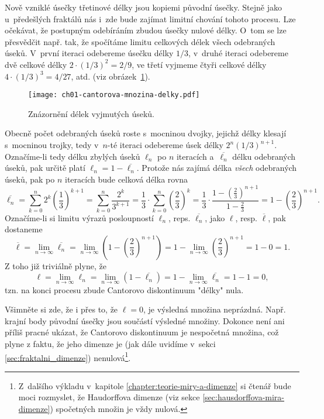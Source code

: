 Nově vzniklé úsečky třetinové délky jsou kopiemi původní úsečky. Stejně jako u~předešlých fraktálů nás i~zde bude zajímat limitní chování tohoto procesu. Lze očekávat, že postupným odebíráním zbudou úsečky nulové délky. O~tom se lze přesvědčit např. tak, že spočítáme limitu celkových délek všech odebraných úseků. V~první iteraci odebereme úsečku délky $1/3$, v~druhé iteraci odebereme dvě celkové délky $2\cdot(1/3)^2=2/9$, ve třetí vyjmeme čtyři celkové délky $4\cdot(1/3)^3=4/27$, atd. (viz obrázek~\ref{fig:cantorovo_diskontinuum_delky}).
\begin{figure}[h]
    \centering
    \texttt{[image: ch01-cantorova-mnozina-delky.pdf]}
    \caption{Znázornění délek vyjmutých úseků.}
    \label{fig:cantorovo_diskontinuum_delky}
\end{figure}
Obecně počet odebraných úseků roste s~mocninou dvojky, jejichž délky klesají s~mocninou trojky, tedy v~$n$-té iteraci odebereme úsek délky $2^n(1/3)^{n+1}$. Označíme-li tedy délku zbylých úseků $\ell_n$ po $n$ iteracích a~$\overline{\ell_n}$ délku odebraných úseků, pak určitě platí $\ell_n=1-\overline{\ell_n}$. Protože nás zajímá délka \emph{všech} odebraných úseků, pak po $n$ iteracích bude celková délka rovna
\begin{equation}
    \overline{\ell_n}=\sum_{k=0}^{n}2^k\left(\dfrac{1}{3}\right)^{k+1}=\sum_{k=0}^{n}\dfrac{2^k}{3^{k+1}}=\dfrac{1}{3}\cdot\sum_{k=0}^{n}\left(\dfrac{2}{3}\right)^k=\dfrac{1}{3}\cdot\dfrac{1-\left(\frac{2}{3}\right)^{n+1}}{1-\frac{2}{3}}=1-\left(\dfrac{2}{3}\right)^{n+1}.
\end{equation}
Označíme-li si limitu výrazů posloupností $\ell_n$, reps. $\overline{\ell_n}$, jako $\ell$, resp. $\overline{\ell}$, pak dostaneme
\begin{equation*}
    \overline{\ell}=\lim_{n\to\infty}\overline{\ell_n}=\lim_{n\to\infty}\left(1-\left(\dfrac{2}{3}\right)^{n+1}\right)=1-\lim_{n\to\infty}\left(\dfrac{2}{3}\right)^{n+1}=1-0=1.
\end{equation*}
Z toho již triviálně plyne, že
\begin{equation}
    \ell=\lim_{n\to\infty}\ell_n=\lim_{n\to\infty}(1-\overline{\ell_n})=1-\lim_{n\to\infty}\overline{\ell_n}=1-1=0,
\end{equation}
tzn. na konci procesu zbude Cantorovo diskontinuum "délky" nula.

Všimněte si zde, že i přes to, že $\ell=0$, je výsledná množina neprázdná. Např. krajní body původní úsečky jsou součástí výsledné množiny. Dokonce není ani příliš pracné ukázat, že Cantorovo diskontinuum je nespočetná množina, což plyne z faktu, že jeho dimenze je (jak dále uvidíme v~sekci \ref{sec:fraktalni_dimenze}) nenulová\footnote{Z~dalšího výkladu v~kapitole \ref{chapter:teorie-miry-a-dimenze} si čtenář bude moci rozmyslet, že Haudorffova dimenze (viz sekce \ref{sec:hausdorffova-mira-dimenze}) spočetných množin je vždy nulová.}.